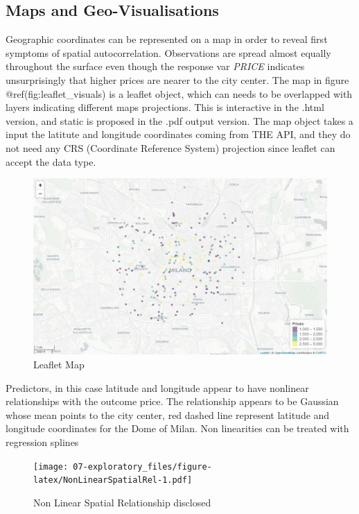 \documentclass[
  12pt,
  a4paper,
  oneside]{book}
\theoremstyle{definition}
\theoremstyle{definition}
\theoremstyle{definition}
\theoremstyle{remark}
\begin{document}
\hypertarget{maps-and-geo-visualisations}{%
\subsection{Maps and Geo-Visualisations}\label{maps-and-geo-visualisations}}

Geographic coordinates can be represented on a map in order to reveal first symptoms of spatial autocorrelation. Observations are spread almost equally throughout the surface even though the response var \emph{PRICE} indicates unsurprisingly that higher prices are nearer to the city center.
The map in figure @ref(fig:leaflet\_visuals) is a leaflet object, which can needs to be overlapped with layers indicating different maps projections. This is interactive in the .html version, and static is proposed in the .pdf output version. The map object takes a input the latitute and longitude coordinates coming from THE API, and they do not need any CRS (Coordinate Reference System) projection since leaflet can accept the data type.

\begin{figure}
\includegraphics[width=1\linewidth]{images/leaflet_prezzi} \caption{Leaflet Map}\label{fig:LeafletVisuals}
\end{figure}

Predictors, in this case latitude and longitude appear to have nonlinear relationships with the outcome price. The relationship appears to be Gaussian whose mean points to the city center, red dashed line represent latitude and longitude coordinates for the Dome of Milan. Non linearities can be treated with regression splines

\begin{figure}
\centering
\texttt{[image: 07-exploratory\_files/figure-latex/NonLinearSpatialRel-1.pdf]}
\caption{\label{fig:NonLinearSpatialRel}Non Linear Spatial Relationship disclosed}
\end{figure}
\end{document}
